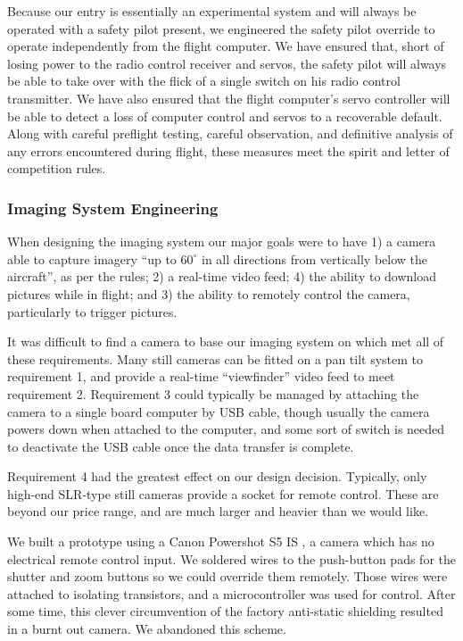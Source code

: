 \documentclass[10pt]{report}
\newcommand{\degrees}[1]
{
\begin{math}
#1^{\circ} 
\end{math}
}
\begin{document}
Because our entry is essentially an experimental system and will always be operated with a safety pilot present, we engineered the safety pilot override to operate independently from the flight computer. We have ensured that, short of losing power to the radio control receiver and servos, the safety pilot will always be able to take over with the flick of a single switch on his radio control transmitter. We have also ensured that the flight computer's servo controller will be able to detect a loss of computer control and servos to a recoverable default. Along with careful preflight testing, careful observation, and definitive analysis of any errors encountered during flight, these measures meet the spirit and letter of competition rules.

\subsubsection{Imaging System Engineering}

When designing the imaging system our major goals were to have 
1) a camera able to capture imagery ``up to \degrees{60} in all directions from vertically below the aircraft''\cite{competition_rules}, as per the rules; 
2) a real-time video feed;
4) the ability to download pictures while in flight; and
3) the ability to remotely control the camera, particularly to trigger pictures.

It was difficult to find a camera to base our imaging system on which met all of these requirements. Many still cameras can be fitted on a pan tilt system to requirement 1, and provide a real-time ``viewfinder'' video feed to meet requirement 2. Requirement 3 could typically be managed by attaching the camera to a single board computer by USB cable, though usually the camera powers down when attached to the computer, and some sort of switch is needed to deactivate the USB cable once the data transfer is complete.

Requirement 4 had the greatest effect on our design decision. Typically, only high-end SLR-type still cameras provide a socket for remote control. These are beyond our price range, and are much larger and heavier than we would like.

We built a prototype using a Canon Powershot S5 IS \cite{powershotS5}, a camera which has no electrical remote control input. We soldered wires to the push-button pads for the shutter and zoom buttons so we could override them remotely. Those wires were attached to isolating transistors, and a microcontroller was used for control. After some time, this clever circumvention of the factory anti-static shielding resulted in a burnt out camera. We abandoned this scheme.
\end{document}
